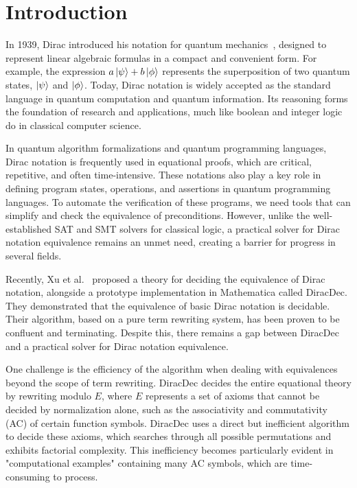 
\section{Introduction}

In 1939, Dirac introduced his notation for quantum mechanics~\cite{dirac1939new}, designed to represent linear algebraic formulas in a compact and convenient form. For example, the expression \( a\ket{\psi} + b\ket{\phi} \) represents the superposition of two quantum states, \( \ket{\psi} \) and \( \ket{\phi} \). Today, Dirac notation is widely accepted as the standard language in quantum computation and quantum information. Its reasoning forms the foundation of research and applications, much like boolean and integer logic do in classical computer science.

In quantum algorithm formalizations and quantum programming languages, Dirac notation is frequently used in equational proofs, which are critical, repetitive, and often time-intensive. These notations also play a key role in defining program states, operations, and assertions in quantum programming languages. To automate the verification of these programs, we need tools that can simplify and check the equivalence of preconditions. However, unlike the well-established SAT and SMT solvers for classical logic, a practical solver for Dirac notation equivalence remains an unmet need, creating a barrier for progress in several fields.

Recently, Xu et al.~\cite{diracdec} proposed a theory for deciding the equivalence of Dirac notation, alongside a prototype implementation in Mathematica called DiracDec. They demonstrated that the equivalence of basic Dirac notation is decidable. Their algorithm, based on a pure term rewriting system, has been proven to be confluent and terminating. Despite this, there remains a gap between DiracDec and a practical solver for Dirac notation equivalence.

One challenge is the efficiency of the algorithm when dealing with equivalences beyond the scope of term rewriting. DiracDec decides the entire equational theory by rewriting modulo \( E \), where \( E \) represents a set of axioms that cannot be decided by normalization alone, such as the associativity and commutativity (AC) of certain function symbols. DiracDec uses a direct but inefficient algorithm to decide these axioms, which searches through all possible permutations and exhibits factorial complexity. This inefficiency becomes particularly evident in "computational examples" containing many AC symbols, which are time-consuming to process.

